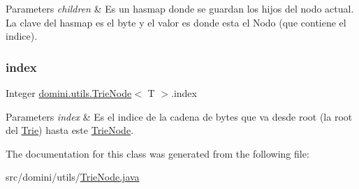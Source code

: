 \begin{DoxyParams}{Parameters}
{\em children} & Es un hasmap donde se guardan los hijos del nodo actual. La clave del hasmap es el byte y el valor es donde esta el Nodo (que contiene el indice). \\
\hline
\end{DoxyParams}
\mbox{\label{classdomini_1_1utils_1_1TrieNode_a9c247bc6568131e5e6ad0758adb67bfa}} 
\subsubsection{\texorpdfstring{index}{index}}
{\footnotesize\ttfamily Integer \hyperlink{classdomini_1_1utils_1_1TrieNode}{domini.\+utils.\+Trie\+Node}$<$ T $>$.index\hspace{0.3cm}{\ttfamily [private]}}


\begin{DoxyParams}{Parameters}
{\em index} & Es el indice de la cadena de bytes que va desde root (la root del \hyperlink{classdomini_1_1utils_1_1Trie}{Trie}) hasta este \hyperlink{classdomini_1_1utils_1_1TrieNode}{Trie\+Node}. \\
\hline
\end{DoxyParams}


The documentation for this class was generated from the following file\+:\begin{DoxyCompactItemize}
\item 
src/domini/utils/\hyperlink{TrieNode_8java}{Trie\+Node.\+java}\end{DoxyCompactItemize}
